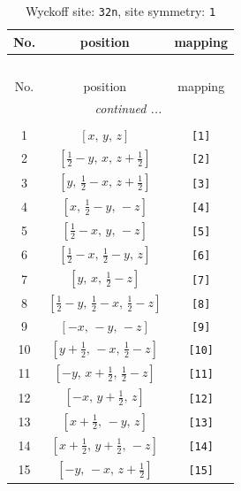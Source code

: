 \documentclass[fleqn,8pt]{jsarticle}
\begin{document}
\renewcommand{\arraystretch}{1.2}
\begin{longtable}{ccc}
\caption{Wyckoff site: {\tt 32n}, site symmetry: {\tt 1}}
 \\
 \hline \hline
No. & position & mapping \\ \hline \endfirsthead

\multicolumn{2}{l}{\tablename\ \thetable{}} \\
 \hline \hline
No. & position & mapping \\ \hline \endhead

 \hline \hline
\multicolumn{2}{r}{\footnotesize\it continued ...} \\ \endfoot

 \hline \hline
\multicolumn{2}{r}{} \\ \endlastfoot

1 & $\left[ x,\, y,\, z \right]$ & {\tt [1]} \\ \hline
2 & $\left[ \frac{1}{2} - y,\, x,\, z + \frac{1}{2} \right]$ & {\tt [2]} \\ \hline
3 & $\left[ y,\, \frac{1}{2} - x,\, z + \frac{1}{2} \right]$ & {\tt [3]} \\ \hline
4 & $\left[ x,\, \frac{1}{2} - y,\, - z \right]$ & {\tt [4]} \\ \hline
5 & $\left[ \frac{1}{2} - x,\, y,\, - z \right]$ & {\tt [5]} \\ \hline
6 & $\left[ \frac{1}{2} - x,\, \frac{1}{2} - y,\, z \right]$ & {\tt [6]} \\ \hline
7 & $\left[ y,\, x,\, \frac{1}{2} - z \right]$ & {\tt [7]} \\ \hline
8 & $\left[ \frac{1}{2} - y,\, \frac{1}{2} - x,\, \frac{1}{2} - z \right]$ & {\tt [8]} \\ \hline
9 & $\left[ - x,\, - y,\, - z \right]$ & {\tt [9]} \\ \hline
10 & $\left[ y + \frac{1}{2},\, - x,\, \frac{1}{2} - z \right]$ & {\tt [10]} \\ \hline
11 & $\left[ - y,\, x + \frac{1}{2},\, \frac{1}{2} - z \right]$ & {\tt [11]} \\ \hline
12 & $\left[ - x,\, y + \frac{1}{2},\, z \right]$ & {\tt [12]} \\ \hline
13 & $\left[ x + \frac{1}{2},\, - y,\, z \right]$ & {\tt [13]} \\ \hline
14 & $\left[ x + \frac{1}{2},\, y + \frac{1}{2},\, - z \right]$ & {\tt [14]} \\ \hline
15 & $\left[ - y,\, - x,\, z + \frac{1}{2} \right]$ & {\tt [15]} \\ \hline

\end{longtable}
\end{document}

